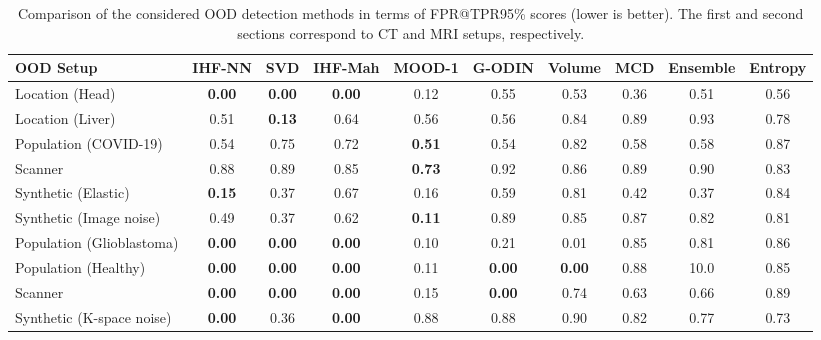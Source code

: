 

\begin{landscape}
\begin{table}[p]
	\centering
	\caption{Comparison of the considered OOD detection methods in terms of FPR@TPR95\% scores (lower is better). The first and second sections correspond to CT and MRI setups, respectively.}
		\begin{tabular}{lccccccccc}
			\toprule
			OOD Setup & IHF-NN & SVD & IHF-Mah & MOOD-1 & G-ODIN & Volume & MCD & Ensemble &   Entropy \\
			\midrule
			Location (Head)           &  \textbf{0.00}  &  \textbf{0.00}  &  \textbf{0.00}  &            0.12 &            0.55 &            0.53 &  0.36 &     0.51 &  0.56 \\
			Location (Liver)          &            0.51 &  \textbf{0.13}  &            0.64 &            0.56 &            0.56 &            0.84 &  0.89 &     0.93 &  0.78 \\
			Population (COVID-19)     &            0.54 &            0.75 &            0.72 &  \textbf{0.51}  &            0.54 &            0.82 &  0.58 &     0.58 &  0.87 \\
			Scanner       &            0.88 &            0.89 &            0.85 &  \textbf{0.73}  &            0.92 &            0.86 &  0.89 &     0.90 &  0.83 \\
			Synthetic (Elastic)       &  \textbf{0.15}  &            0.37 &            0.67 &            0.16 &            0.59 &            0.81 &  0.42 &     0.37 &  0.84 \\
			Synthetic (Image noise)   &            0.49 &            0.37 &            0.62 &  \textbf{0.11}  &            0.89 &            0.85 &  0.87 &     0.82 &  0.81 \\
			\midrule
			Population (Glioblastoma) &  \textbf{0.00}  &  \textbf{0.00}  &  \textbf{0.00}  &            0.10 &            0.21 &            0.01 &  0.85 &     0.81 &  0.86 \\
			Population (Healthy)      &  \textbf{0.00}  &  \textbf{0.00}  &  \textbf{0.00}  &            0.11 &  \textbf{0.00}  &  \textbf{0.00}  &  0.88 &     10.0 &  0.85 \\
			Scanner                   &  \textbf{0.00}  &  \textbf{0.00}  &  \textbf{0.00}  &            0.15 &  \textbf{0.00}  &            0.74 &  0.63 &     0.66 &  0.89 \\
			Synthetic (K-space noise) &  \textbf{0.00}  &            0.36 &  \textbf{0.00}  &            0.88 &            0.88 &            0.90 &  0.82 &     0.77 &  0.73 \\

\end{tabular}
\end{table}
\end{landscape}
